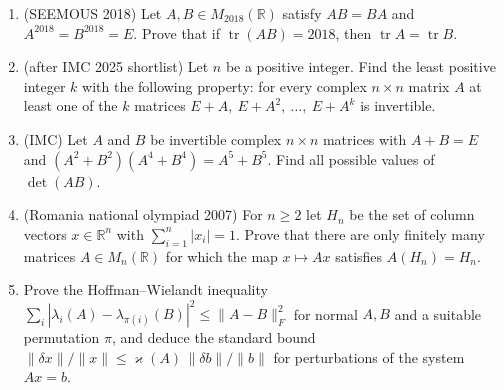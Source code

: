 \documentclass[11pt,a4paper]{article}
\DeclareMathOperator{\tr}{tr}
\begin{document}
\begin{enumerate}
\item (SEEMOUS 2018) Let $A,B\in M_{2018}(\mathbb R)$ satisfy $AB=BA$ and $A^{2018}=B^{2018}=E$.
Prove that if $\tr(AB)=2018$, then $\tr A=\tr B$.

\item (after IMC 2025 shortlist) Let $n$ be a positive integer. Find the least positive integer
$k$ with the following property: for every complex $n\times n$ matrix $A$ at least one of the $k$
matrices $E+A,\ E+A^2,\ \dots,\ E+A^k$ is invertible.

\item (IMC) Let $A$ and $B$ be invertible complex $n\times n$ matrices with $A+B=E$ and
$(A^2+B^2)(A^4+B^4)=A^5+B^5$. Find all possible values of $\det(AB)$.

\item (Romania national olympiad 2007) For $n\geqslant2$ let $H_n$ be the set of column vectors
$x\in\mathbb R^n$ with $\sum_{i=1}^n|x_i|=1$. Prove that there are only finitely many matrices
$A\in M_n(\mathbb R)$ for which the map $x\mapsto Ax$ satisfies $A(H_n)=H_n$.

\item Prove the Hoffman--Wielandt inequality
$\sum_i|\lambda_i(A)-\lambda_{\pi(i)}(B)|^2\leqslant\|A-B\|_F^2$ for normal $A,B$ and a suitable
permutation $\pi$, and deduce the standard bound
$\|\delta x\|/\|x\|\leqslant\varkappa(A)\,\|\delta b\|/\|b\|$ for perturbations of the system
$Ax=b$.
\end{enumerate}
\end{document}
